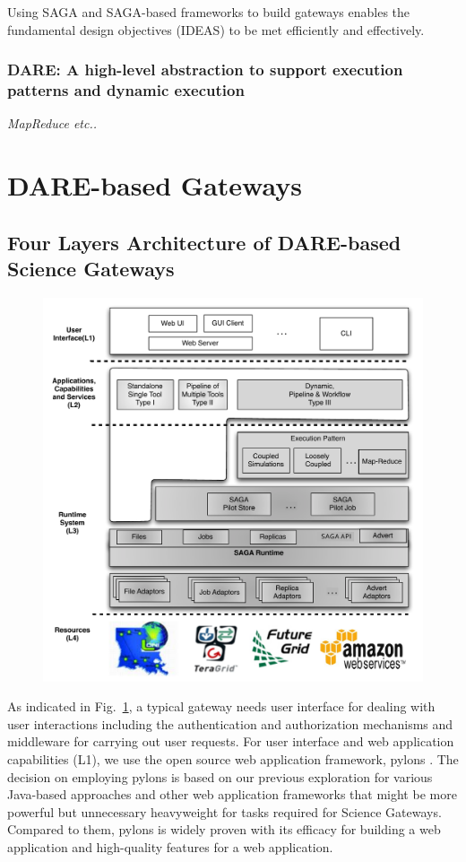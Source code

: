 \documentclass[]{article}
\begin{document}
Using SAGA and SAGA-based frameworks to build gateways enables the
fundamental design objectives (IDEAS) to be met efficiently and
effectively.

\subsubsection{DARE: A high-level abstraction to support execution
  patterns and dynamic execution} 

{\it MapReduce etc..}

\section{DARE-based Gateways}

\subsection{Four Layers Architecture of DARE-based Science
  Gateways}

\begin{figure}
  \centering
  \includegraphics[scale=0.40]{figures/DARE-gateway-arch.pdf}
  \caption{\small {}}
  \label{fig:dare-arch} 
\end{figure}


As indicated in Fig.~\ref{fig:dare-arch}, a typical gateway needs user interface for dealing with user interactions including the authentication and authorization mechanisms and middleware for carrying out user requests.  For user interface and web application capabilities (L1), we use the open source web application framework, pylons\cite{pylonsurl} .  The decision on employing pylons is based on our previous exploration for various Java-based approaches and other web application frameworks that might be more powerful but unnecessary heavyweight for tasks required for Science Gateways. Compared to them, pylons is widely proven with its efficacy for building a web application and high-quality features for a web application. 
\end{document}
